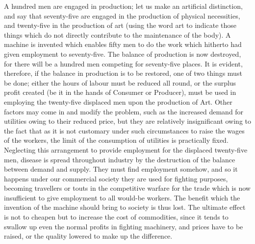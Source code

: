 \documentclass{book}
\begin{document}
A hundred men are engaged in production; let us make an artificial distinction, and say that seventy-five are engaged in the production of physical necessities, and twenty-five in the production of art (using the word art to indicate those things which do not directly contribute to the maintenance of the body). A machine is invented which enables fifty men to do the work which hitherto had given employment to seventy-five. The balance of production is now destroyed, for there will be a hundred men competing for seventy-five places. It is evident, therefore, if the balance in production is to be restored, one of two things must be done; either the hours of labour must be reduced all round, or the surplus profit created (be it in the hands of Consumer or Producer), must be used in employing the twenty-five displaced men upon the production of Art. Other factors may come in and modify the problem, such as the increased demand for utilities owing to their reduced price, but they are relatively insignificant owing to the fact that as it is not customary under such circumstances to raise the wages of the workers, the limit of the consumption of utilities is practically fixed. Neglecting this arrangement to provide employment for the displaced twenty-five men, disease is spread throughout industry by the destruction of the balance between demand and supply. They must find employment somehow, and so it happens under our commercial society they are used for fighting purposes, becoming travellers or touts in the competitive warfare for the trade which is now insufficient to give employment to all would-be workers. The benefit which the invention of the machine should bring to society is thus lost. The ultimate effect is not to cheapen but to increase the cost of commodities, since it tends to swallow up even the normal profits in fighting machinery, and prices have to be raised, or the quality lowered to make up the difference.
\end{document}
